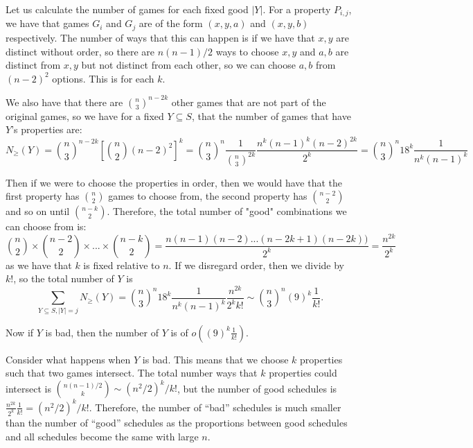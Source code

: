 \documentclass[]{article}
\theoremstyle{definition}
\numberwithin{theorem}{section}
\numberwithin{equation}{section}
\begin{document}
Let us calculate the number of games for each fixed good $|Y|$. For a property $P_{i, j}$, we have that games $G_i$ and $G_j$ are of the form $(x, y, a)$ and $(x, y, b)$ respectively. The number of ways that this can happen is if we have that $x, y$ are distinct without order, so there are $n(n-1)/2$ ways to choose $x, y$ and $a, b$ are distinct from $x, y$ but not distinct from each other, so we can choose $a, b$ from $(n-2)^2$ options. This is for each $k$.

We also have that there are $\binom{n}{3}^{n - 2k}$ other games that are not part of the original games, so we have for a fixed $Y \subseteq S$, that the number of games that have $Y$'s properties are:
\begin{equation}
	N_\geq(Y) = \binom{n}{3}^{n - 2k} \left[ \binom{n}{2} (n - 2)^2 \right]^k = \binom{n}{3}^n \frac{1}{\binom{n}{3}^{2k}} \frac{n^{k} (n - 1)^{k} (n - 2)^{2k}}{2^{k}} = \binom{n}{3}^n 18^{k} \frac{1}{n^k(n-1)^k}
\end{equation}


Then if we were to choose the properties in order, then we would have that the first property has $\binom{n}{2}$ games to choose from, the second property has $\binom{n-2}{2}$ and so on until $\binom{n-k}{2}$. Therefore, the total number of "good" combinations we can choose from is:
\begin{equation}
	\binom{n}{2} \times \binom{n-2}{2} \times ... \times \binom{n - k}{2} = \frac{n(n -1) (n - 2) ... (n - 2k + 1)(n - 2k))}{2^k} = \frac{n^{2k}}{2^k}
\end{equation}
as we have that $k$ is fixed relative to $n$. 
If we disregard order, then we divide by $k!$, so the total number of $Y$ is
\begin{equation}
	\sum_{Y \subseteq S, |Y| = j} N_\geq(Y) = \binom{n}{3}^n 18^{k} \frac{1}{n^k(n-1)^k}\frac{n^{2k}}{2^k k!} \sim \binom{n}{3}^n \left(9\right)^k \frac{1}{k!}.
\end{equation}

Now if $Y$ is bad, then the number of $Y$ is of $o(\left(9\right)^k \frac{1}{k!})$.

Consider what happens when $Y$ is bad. This means that we choose $k$ properties such that two games intersect. The total number ways that $k$ properties could intersect is $\binom{n(n - 1)/2}{k} \sim (n^2/2)^k/k!$, but the number of good schedules is $\frac{n^{2k}}{2^k}\frac{1}{k!} = (n^2/2)^k/ k!$. Therefore, the number of ``bad'' schedules is much smaller than the number of ``good''  schedules as the proportions between good schedules and all schedules become the same with large $n$. 
\end{document}
